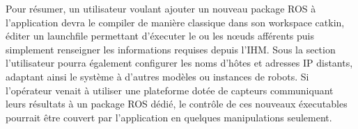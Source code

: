 Pour résumer, un utilisateur voulant ajouter un nouveau package ROS à l'application devra le compiler de manière classique dans son workspace catkin, éditer un launchfile permettant d'éxecuter le ou les n\oe{}uds afférents puis
simplement renseigner les informations requises depuis l'IHM. 
Sous la section  l'utilisateur pourra également configurer les noms d'hôtes et adresses IP distants, adaptant ainsi le système à d'autres modèles ou instances de robots. 
Si l'opérateur venait à utiliser une plateforme dotée de capteurs communiquant leurs résultats à un package ROS dédié, le contrôle de ces nouveaux éxecutables pourrait être couvert par l'application en quelques manipulations seulement.  